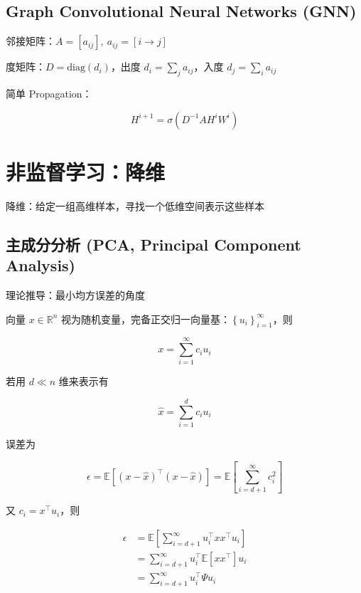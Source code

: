 \documentclass[openany,a4paper,12pt]{ctexbook}
\theoremstyle{kaiti}
\theoremstyle{normal}
\begin{document}
\section{Graph Convolutional Neural Networks (GNN)}

邻接矩阵：$A=\left[a_{ij} \right],~a_{ij}=\left[i\rightarrow j \right]$

度矩阵：$D=\mathrm{diag}\left(d_i \right)$，出度 $d_i=\sum_ja_{ij}$，入度 $d_j=\sum_ia_{ij}$

简单 Propagation：

\begin{equation}
H^{i+1}=\sigma \left(D^{-1}AH^iW^i \right)
\end{equation}

\chapter{非监督学习：降维}

降维：给定一组高维样本，寻找一个低维空间表示这些样本

\section{主成分分析 (PCA, Principal Component Analysis) }

理论推导：最小均方误差的角度

向量 $x\in \mathbb{R} ^n$ 视为随机变量，完备正交归一向量基：$\left\{ u_i \right\}_{i=1}^{\infty}$，则 

\begin{equation}
x=\sum_{i=1}^{\infty}c_iu_i
\end{equation}

若用 $d\ll n$ 维来表示有 

\begin{equation}
\hat{x}=\sum_{i=1}^{d}c_iu_i
\end{equation}

误差为

\begin{equation}
\epsilon =\mathbb{E} \left[\left(x-\hat{x} \right)^{\top}\left(x-\hat{x} \right)\right] =\mathbb{E} \left[\sum_{i=d+1}^{\infty}c_{i}^{2} \right]
\end{equation}

又 $c_i=x^{\top}u_i$，则

\begin{equation}
\begin{aligned}
  \epsilon 
  &=\mathbb{E} \left[\sum_{i=d+1}^{\infty}u_{i}^{\top}xx^{\top}u_i \right] \\
  &=\sum_{i=d+1}^{\infty}u_{i}^{\top}\mathbb{E} \left[xx^{\top} \right] u_i\\
  &=\sum_{i=d+1}^{\infty}u_{i}^{\top}\Psi u_i\\
\end{aligned}
\end{equation}
\end{document}
